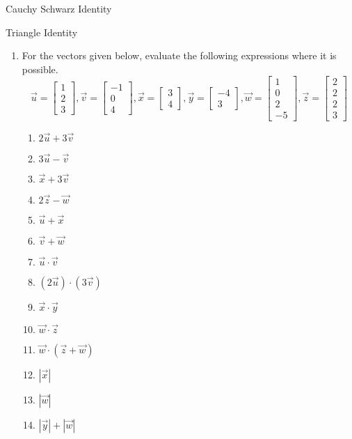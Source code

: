 \documentclass[12pt,a4paper]{article}
\begin{document}
Cauchy Schwarz Identity

Triangle Identity


\begin{enumerate}
	\item For the vectors given below, evaluate the following expressions where it is possible.
	\begin{equation*}
	\vec{u}=\left[ \begin{array}{c} 1 \\ 2 \\ 3 \end{array}\right],
	\vec{v}=\left[ \begin{array}{c} -1 \\ 0 \\ 4 \end{array}\right],
	\vec{x}=\left[ \begin{array}{c} 3 \\ 4 \end{array}\right],
	\vec{y}=\left[ \begin{array}{c} -4 \\ 3 \end{array}\right],
	\vec{w}=\left[ \begin{array}{c} 1 \\ 0\\ 2 \\ -5 \end{array}\right],
	\vec{z}=\left[ \begin{array}{c} 2 \\ 2 \\ 2 \\ 3 \end{array}\right]
	\end{equation*}
	\begin{multicols}{3}
		\begin{enumerate}
			\item $2\vec{u} + 3\vec{v}$
			\item $3\vec{u} - \vec{v}$
			\item $\vec{x} + 3\vec{v}$
			\item $2\vec{z} - \vec{w}$
			\item $\vec{u}+\vec{x}$
			\item $\vec{v}+\vec{w}$
			\item $\vec{u}\cdot \vec{v}$
			\item $\left(2\vec{u}\right)\cdot \left(3\vec{v}\right)$
			\item $\vec{x}\cdot \vec{y}$
			\item $\vec{w} \cdot \vec{z}$
			\item $\vec{w} \cdot (\vec{z}+\vec{w})$
			\item $|\vec{x}|$
			\item $|\vec{w}|$
			\item $|\vec{y}|+|\vec{w}|$
		\end{enumerate}
	\end{multicols}
	

\end{enumerate}
\end{document}
